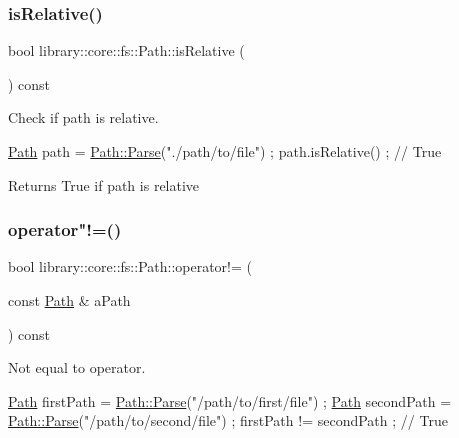 \subsubsection{\texorpdfstring{is\+Relative()}{isRelative()}}
{\footnotesize\ttfamily bool library\+::core\+::fs\+::\+Path\+::is\+Relative (\begin{DoxyParamCaption}{ }\end{DoxyParamCaption}) const}



Check if path is relative. 


\begin{DoxyCode}
\hyperlink{classlibrary_1_1core_1_1fs_1_1_path_aaba9a8e0153813f08f78f1c3275734a4}{Path} path = \hyperlink{classlibrary_1_1core_1_1fs_1_1_path_aebf5bd3af83e0b7376616e146f3e55df}{Path::Parse}(\textcolor{stringliteral}{"./path/to/file"}) ;
path.isRelative() ; \textcolor{comment}{// True}
\end{DoxyCode}


\begin{DoxyReturn}{Returns}
True if path is relative 
\end{DoxyReturn}
\mbox{\label{classlibrary_1_1core_1_1fs_1_1_path_a79b3a6951753c591bab57ee41f7c4c6f}} 
\subsubsection{\texorpdfstring{operator"!=()}{operator!=()}}
{\footnotesize\ttfamily bool library\+::core\+::fs\+::\+Path\+::operator!= (\begin{DoxyParamCaption}\item[{const \hyperlink{classlibrary_1_1core_1_1fs_1_1_path}{Path} \&}]{a\+Path }\end{DoxyParamCaption}) const}



Not equal to operator. 


\begin{DoxyCode}
\hyperlink{classlibrary_1_1core_1_1fs_1_1_path_aaba9a8e0153813f08f78f1c3275734a4}{Path} firstPath = \hyperlink{classlibrary_1_1core_1_1fs_1_1_path_aebf5bd3af83e0b7376616e146f3e55df}{Path::Parse}(\textcolor{stringliteral}{"/path/to/first/file"}) ;
\hyperlink{classlibrary_1_1core_1_1fs_1_1_path_aaba9a8e0153813f08f78f1c3275734a4}{Path} secondPath = \hyperlink{classlibrary_1_1core_1_1fs_1_1_path_aebf5bd3af83e0b7376616e146f3e55df}{Path::Parse}(\textcolor{stringliteral}{"/path/to/second/file"}) ;
firstPath != secondPath ; \textcolor{comment}{// True}
\end{DoxyCode}



